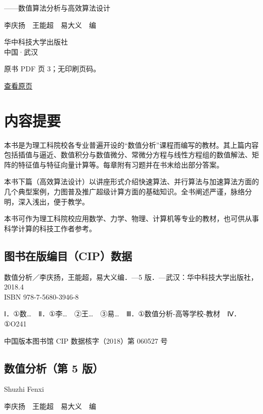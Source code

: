 ------数值算法分析与高效算法设计

李庆扬　王能超　易大义　编

华中科技大学出版社\\
中国·武汉

\clearpage

原书 PDF 页 3；无印刷页码。

\href{source-images/pdf-003.jpeg}{查看原页}

\section{内容提要}\label{front-ux5185ux5bb9ux63d0ux8981}

本书是为理工科院校各专业普遍开设的``数值分析''课程而编写的教材。其上篇内容包括插值与逼近、数值积分与数值微分、常微分方程与线性方程组的数值解法、矩阵的特征值与特征向量计算等。每章附有习题并在书末给出部分答案。

本书下篇（高效算法设计）以讲座形式介绍快速算法、并行算法与加速算法方面的几个典型案例，力图普及推广超级计算方面的基础知识。全书阐述严谨，脉络分明，深入浅出，便于教学。

本书可作为理工科院校应用数学、力学、物理、计算机等专业的教材，也可供从事科学计算的科技工作者参考。

\subsection{图书在版编目（CIP）数据}\label{front-ux56feux4e66ux5728ux7248ux7f16ux76eecipux6570ux636e}

数值分析／李庆扬，王能超，易大义编．---5 版．---武汉：华中科技大学出版社，2018.4\\
ISBN 978-7-5680-3946-8

Ⅰ．①数\ldots{}　Ⅱ．①李\ldots{}　②王\ldots{}　③易\ldots{}　Ⅲ．①数值分析-高等学校-教材　Ⅳ．①O241

中国版本图书馆 CIP 数据核字（2018）第 060527 号

\subsection{数值分析（第 5 版）}\label{front-ux6570ux503cux5206ux6790ux7b2c-5-ux7248-1}

Shuzhi Fenxi

李庆扬　王能超　易大义　编

